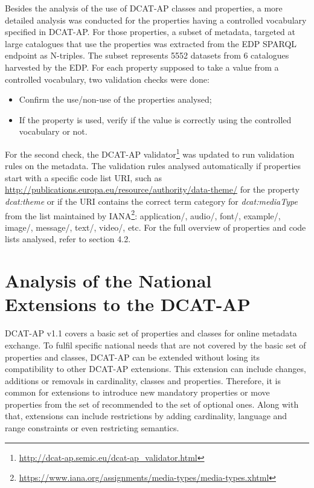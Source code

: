\documentclass[<options>]{elsarticle}
\begin{document}
Besides the analysis of the use of DCAT-AP classes and properties, a more detailed analysis was conducted for the properties having a controlled vocabulary specified in DCAT-AP. For those properties, a subset of metadata, targeted at large catalogues that use the properties was extracted from the EDP SPARQL endpoint as N-triples. The subset represents 5552 datasets from 6 catalogues harvested by the EDP. For each property supposed to take a value from a controlled vocabulary, two validation checks were done:

\begin{itemize}
\item Confirm the use/non-use of the properties analysed;
\item If the property is used, verify if the value is correctly using the controlled vocabulary or not.
\end{itemize}

For the second check, the DCAT-AP validator\footnote{\href{ http://dcat-ap.semic.eu/dcat-ap_validator.html}{ http://dcat-ap.semic.eu/dcat-ap\_validator.html}} was updated to run validation rules on the metadata. The validation rules analysed automatically if properties start with a specific code list URI, such as \url{http://publications.europa.eu/resource/authority/data-theme/} for the property \textit{dcat:theme} or if the URI contains the correct term category for \textit{dcat:mediaType} from the list maintained by IANA\footnote{\href{  https://www.iana.org/assignments/media-types/media-types.xhtml}{https://www.iana.org/assignments/media-types/media-types.xhtml}}: application/, audio/, font/, example/, image/, message/, text/, video/, etc.  For the full overview of properties and code lists analysed, refer to section 4.2. 
% 
% 
% 

\section{Analysis of the National Extensions to the DCAT-AP}
DCAT-AP v1.1 covers a basic set of properties and classes for online metadata exchange. To fulfil specific national needs that are not covered by the basic set of properties and classes, DCAT-AP can be extended without losing its compatibility to other DCAT-AP extensions. This extension can include changes, additions or removals in cardinality, classes and properties. Therefore, it is common for extensions to introduce new mandatory properties or move properties from the set of recommended to the set of optional ones. Along with that, extensions can include restrictions by adding cardinality, language and range constraints or even restricting semantics.
\end{document}
